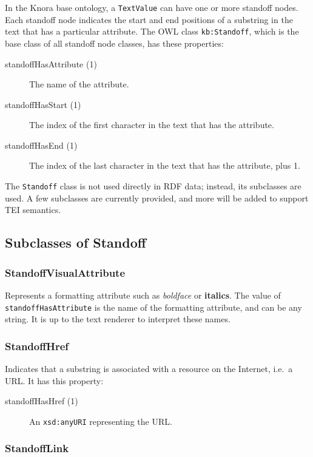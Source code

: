 \documentclass[12pt, a4paper]{article}
\begin{document}
In the Knora base ontology, a \texttt{TextValue} can have one or more standoff nodes. Each standoff node indicates the start and end positions of a substring in the text that has a particular attribute. The OWL class \texttt{kb:Standoff}, which is the base class of all standoff node classes, has these properties:

\begin{description}
	\item[standoffHasAttribute (1)] The name of the attribute.
	\item[standoffHasStart (1)] The index of the first character in the text that has the attribute.
	\item[standoffHasEnd (1)] The index of the last character in the text that has the attribute, plus 1.
\end{description}

The \texttt{Standoff} class is not used directly in RDF data; instead, its subclasses are used. A few subclasses are currently provided, and more will be added to support TEI semantics.

\subsection{Subclasses of Standoff}

\subsubsection{StandoffVisualAttribute}

Represents a formatting attribute such as {\it boldface} or {\bf italics}. The value of \texttt{standoffHasAttribute} is the name of the formatting attribute, and can be any string. It is up to the text renderer to interpret these names.

\subsubsection{StandoffHref}

Indicates that a substring is associated with a resource on the Internet, i.e.\ a URL. It has this property:

\begin{description}
	\item[standoffHasHref (1)] An \texttt{xsd:anyURI} representing the URL.
\end{description}

\subsubsection{StandoffLink}
\end{document}
